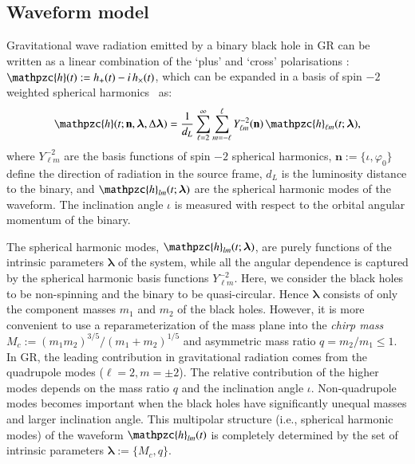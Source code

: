 \documentclass[prd,preprintnumbers,twocolumn,eqsecnum,floatfix,a4paper,nofootinbib,superscriptaddress]{revtex4}
\newcommand{\h}{\mathpzc{h}}
\newcommand{\hlm}{\mathpzc{h}_{\ell m}}
\newcommand{\Ylm}{{Y}^{-2}_{\ell m}}
\newcommand{\blambda}{\bm{\lambda}}
\newcommand{\n}{\mathbf{n}}
\begin{document}
\subsection{Waveform model}
Gravitational wave radiation emitted by a binary black hole in GR can be written as a linear combination of the `plus' and `cross' polarisations : $\h(t) := h_+(t) - i \, h_\times(t)$, which can be expanded in a basis of spin $-2$ weighted spherical harmonics~\cite{NewmanPenrose} as:
\begin{equation}
\h(t; \n, \blambda, \Delta \blambda)= \frac{1}{d_L} \sum _{\ell=2}^{\infty} \sum _{m=-\ell}^{\ell} {\Ylm} (\n) \, {{\hlm}(t; {\blambda})}, 
\label{eq:spherical_harmonics}
\end{equation}
where ${\Ylm}$ are the basis functions of spin $-2$ spherical harmonics, $\n := \{\iota, \varphi_0\}$ define the direction of radiation in the source frame, $d_L$ is  the luminosity distance to the binary, and ${\h}_{lm}(t; \blambda)$ are the spherical harmonic modes of the waveform. The inclination angle $\iota$ is measured with respect to the orbital angular momentum of the binary. 

The spherical harmonic modes, ${\h}_{lm}(t; \blambda)$, are purely functions of the intrinsic parameters $\blambda$ of the system, while all the angular dependence is captured by the spherical harmonic basis functions ${\Ylm}$.  Here, we consider the black holes to be non-spinning and the binary to be quasi-circular. Hence $\blambda$ consists of only the component masses $m_1$ and $m_2$ of the black holes. However, it is more convenient to use a reparameterization of the mass plane into the \emph{chirp mass} $M_c := {(m_1m_2)^{3/5}}/{(m_1+m_2)^{1/5}}$ and asymmetric mass ratio $q = m_2/m_1 \leq 1$. In GR, the leading contribution in gravitational radiation comes from the quadrupole modes ($\ell = 2, m = \pm 2$). The relative contribution of the higher modes depends on the mass ratio $q$ and the inclination angle $\iota$.  Non-quadrupole modes becomes important when the black holes have significantly unequal masses and larger inclination angle. This multipolar structure (i.e., spherical harmonic modes) of the waveform ${\h}_{lm}(t)$ is completely determined by the set of intrinsic parameters $\blambda := \{M_c, q\}$.
\end{document}
